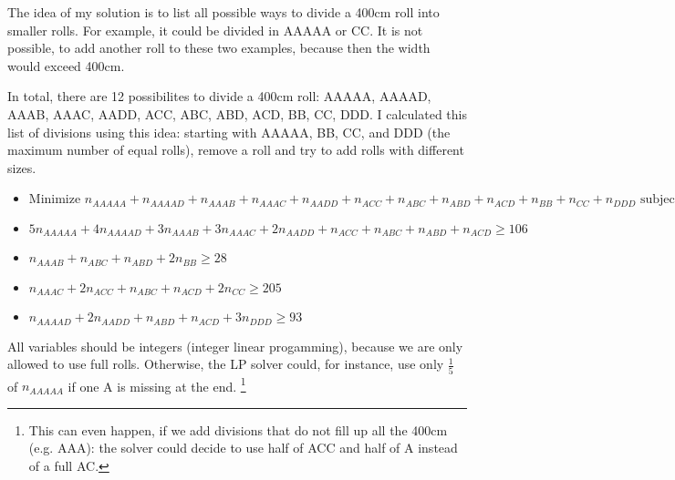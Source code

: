 \documentclass[12pt]{article}
\begin{document}
The idea of my solution is to list all possible ways to divide a 400cm roll into smaller rolls. For example, it could be divided in AAAAA or CC. It is not possible, to add another roll to these two examples, because then the width would exceed 400cm.

In total, there are 12 possibilites to divide a 400cm roll: AAAAA, AAAAD, AAAB, AAAC, AADD, ACC, ABC, ABD, ACD, BB, CC, DDD. I calculated this list of divisions using this idea: starting with AAAAA, BB, CC, and DDD (the maximum number of equal rolls), remove a roll and try to add rolls with different sizes.

\begin{itemize}
	\item $ \mbox{Minimize } n_{AAAAA} + n_{AAAAD} + n_{AAAB} + n_{AAAC} + n_{AADD} + n_{ACC} + n_{ABC} + n_{ABD} + n_{ACD} + n_{BB} + n_{CC} + n_{DDD} \mbox{ subject to}$
	\item $ 5 n_{AAAAA} + 4 n_{AAAAD} + 3 n_{AAAB} + 3 n_{AAAC} + 2 n_{AADD} + n_{ACC} + n_{ABC} + n_{ABD} + n_{ACD} \geq 106$
	\item $ n_{AAAB} + n_{ABC} + n_{ABD} + 2 n_{BB} \geq 28$
	\item $ n_{AAAC} + 2 n_{ACC} + n_{ABC} + n_{ACD} + 2 n_{CC} \geq 205$
	\item $ n_{AAAAD} + 2 n_{AADD} + n_{ABD} + n_{ACD} + 3 n_{DDD} \geq 93$
\end{itemize}

All variables should be integers (integer linear progamming), because we are only allowed to use full rolls. Otherwise, the LP solver could, for instance, use only $\frac{1}{5}$ of $n_{AAAAA}$ if one A is missing at the end. \footnote{This can even happen, if we add divisions that do not fill up all the 400cm (e.g. AAA): the solver could decide to use half of ACC and half of A instead of a full AC.}
\end{document}
